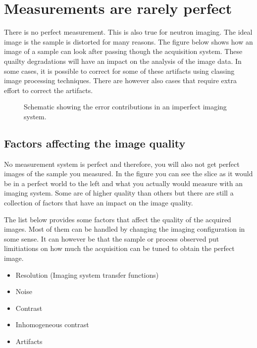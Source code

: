 \documentclass[letterpaper,10pt,english]{sphinxmanual}
\begin{document}
\chapter{Measurements are rarely perfect}
\label{\detokenize{02-ImageEnhancement:measurements-are-rarely-perfect}}


\sphinxAtStartPar
There is no perfect measurement. This is also true for neutron imaging. The ideal image is the sample is distorted for many reasons. The figure below shows how an image of a sample can look after passing though the acquisition system. These quailty degradations will have an impact on the analysis of the image data. In some cases, it is possible to correct for some of these artifacts using classing image processing techniques. There are however also cases that require extra effort to correct the artifacts.

\begin{figure}[htbp]
\centering
\capstart

\noindent{}
\caption{Schematic showing the error contributions in an imperfect imaging system.}\label{\detokenize{02-ImageEnhancement:id4}}\end{figure}


\section{Factors affecting the image quality}
\label{\detokenize{02-ImageEnhancement:factors-affecting-the-image-quality}}
\sphinxAtStartPar
No measurement system is perfect and therefore, you will also not get perfect images of the sample you measured. In the figure you can see the slice as it would be in a perfect world to the left and what you actually would measure with an imaging system. Some are of higher quality than others but there are still a collection of factors that have an impact on the image quality.

\sphinxAtStartPar
The list below provides some factors that affect the quality of the acquired images. Most of them can be handled by changing the imaging configuration in some sense. It can however be that the sample or process observed put limitiations on how much the acquisition can be tuned to obtain the perfect image.
\begin{itemize}
\item {} 
\sphinxAtStartPar
Resolution (Imaging system transfer functions)

\item {} 
\sphinxAtStartPar
Noise

\item {} 
\sphinxAtStartPar
Contrast

\item {} 
\sphinxAtStartPar
Inhomogeneous contrast

\item {} 
\sphinxAtStartPar
Artifacts

\end{itemize}
\end{document}
